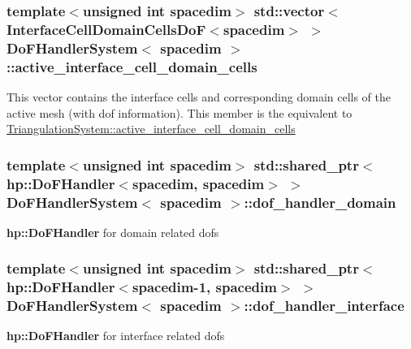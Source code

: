 \subsubsection[{\texorpdfstring{active\+\_\+interface\+\_\+cell\+\_\+domain\+\_\+cells}{active_interface_cell_domain_cells}}]{\setlength{\rightskip}{0pt plus 5cm}template$<$unsigned int spacedim$>$ std\+::vector$<${\bf Interface\+Cell\+Domain\+Cells\+DoF}$<$spacedim$>$ $>$ {\bf Do\+F\+Handler\+System}$<$ spacedim $>$\+::active\+\_\+interface\+\_\+cell\+\_\+domain\+\_\+cells\hspace{0.3cm}{\ttfamily [private]}}\hypertarget{class_do_f_handler_system_af0119b14377300f7f0457a18bb7dcd67}{}\label{class_do_f_handler_system_af0119b14377300f7f0457a18bb7dcd67}
This vector contains the interface cells and corresponding domain cells of the active mesh (with dof information). This member is the equivalent to \hyperlink{class_triangulation_system_a516c7a253cefbc5e208714538b21424d}{Triangulation\+System\+::active\+\_\+interface\+\_\+cell\+\_\+domain\+\_\+cells} 
\subsubsection[{\texorpdfstring{dof\+\_\+handler\+\_\+domain}{dof_handler_domain}}]{\setlength{\rightskip}{0pt plus 5cm}template$<$unsigned int spacedim$>$ std\+::shared\+\_\+ptr$<${\bf hp\+::\+Do\+F\+Handler}$<$spacedim, spacedim$>$ $>$ {\bf Do\+F\+Handler\+System}$<$ spacedim $>$\+::dof\+\_\+handler\+\_\+domain\hspace{0.3cm}{\ttfamily [private]}}\hypertarget{class_do_f_handler_system_ac3c43d8113395b0011179231ff6c58aa}{}\label{class_do_f_handler_system_ac3c43d8113395b0011179231ff6c58aa}
{\bf hp\+::\+Do\+F\+Handler} for domain related dofs 
\subsubsection[{\texorpdfstring{dof\+\_\+handler\+\_\+interface}{dof_handler_interface}}]{\setlength{\rightskip}{0pt plus 5cm}template$<$unsigned int spacedim$>$ std\+::shared\+\_\+ptr$<${\bf hp\+::\+Do\+F\+Handler}$<$spacedim-\/1, spacedim$>$ $>$ {\bf Do\+F\+Handler\+System}$<$ spacedim $>$\+::dof\+\_\+handler\+\_\+interface\hspace{0.3cm}{\ttfamily [private]}}\hypertarget{class_do_f_handler_system_aa9480c1fcf0d9170c026ef6611074d06}{}\label{class_do_f_handler_system_aa9480c1fcf0d9170c026ef6611074d06}
{\bf hp\+::\+Do\+F\+Handler} for interface related dofs 

